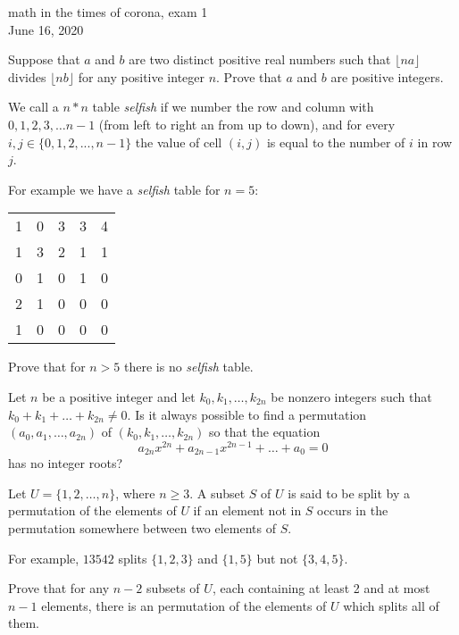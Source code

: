 \thispagestyle{empty}

\begin{center}
	\LARGE math in the times of corona, exam 1\\[1em]
	\normalsize June 16, 2020
\end{center}

\vspace*{2em}

\begin{problem_0}%
	Suppose that $a$ and $b$ are two distinct positive real numbers such that $\lfloor na\rfloor$ divides $\lfloor nb\rfloor$ for any positive integer $n$. Prove that $a$ and $b$ are positive integers.
\end{problem_0}

\begin{problem_0}%
	We call a $n*n$ table \emph{selfish} if we number the row and column with $0,1,2,3, \dots n-1$ (from left to right an from up to down), and for every $i,j\in\{0,1,2,...,n-1\}$ the value of cell $(i,j)$ is equal to the number of $i$ in row $j$.
	
	For example we have a \emph{selfish} table for $n=5$:
	\begin{center}
		\begin{tabular}{ccccc}
			1 & 0 & 3 & 3 & 4 \\
			1 & 3 & 2 & 1 & 1 \\
			0 & 1 & 0 & 1 & 0 \\
			2 & 1 & 0 & 0 & 0 \\
			1 & 0 & 0 & 0 & 0 \\
		\end{tabular}
	\end{center}
	Prove that for $n>5$ there is no \emph{selfish} table.
\end{problem_0}

\begin{problem_0}%
	Let $n$ be a positive integer and let $k_0,k_1, \dots,k_{2n}$ be nonzero integers such that $k_0+k_1 +\dots+k_{2n}\neq 0$. Is it always possible to find a permutation $(a_0,a_1,\dots,a_{2n})$ of $(k_0,k_1,\dots,k_{2n})$ so that the equation
	\[a_{2n}x^{2n}+a_{2n-1}x^{2n-1}+\dots+a_0=0\]
	has no integer roots?
\end{problem_0}

\begin{problem_0}%
	Let $U=\{1,2,\ldots ,n\}$, where $n\geq 3$. A subset $S$ of $U$ is said to be split by a permutation of the elements of $U$ if an element not in $S$ occurs in the permutation somewhere between two elements of $S$. 
	
	For example, $ 13542 $ splits $\{1,2,3\}$ and $ \{1, 5\} $ but not $\{3,4,5\}$. 
	
	Prove that for any $n-2$ subsets of $U$, each containing at least 2 and at most $n-1$ elements, there is an permutation of the elements of $U$ which splits all of them.
\end{problem_0}

